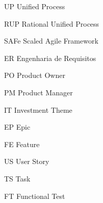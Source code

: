 \begin{siglas}
  \item[UP] Unified Process
  \item[RUP] Rational Unified Process
  \item[SAFe] Scaled Agile Framework
  \item[ER] Engenharia de Requisitos
  \item[PO] Product Owner
  \item[PM] Product Manager
  \item[IT] Investment Theme
  \item[EP] Epic
  \item[FE] Feature
  \item[US] User Story
  \item[TS] Task
  \item[FT] Functional Test

\end{siglas}
